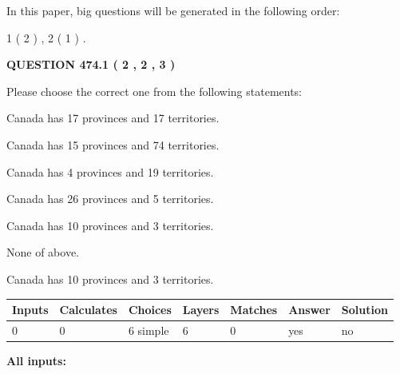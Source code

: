 \documentclass[12pt]{article}
\begin{document}
\vspace{0.2in}
   
In this paper, big questions will be generated in the following order: 
   
   
   1 ( 2 )
 ,
   2 ( 1 )
 .
  
\vspace{0.2in}
  
{\textbf{\Large{QUESTION
474.1 
 ( 2 , 2 , 3 )
}}}
  
  
Please choose the correct one from the following statements:
 
 
Canada has  17 provinces and  17 territories.
 
 
Canada has  15 provinces and  74 territories.
 
 
Canada has   4 provinces and  19 territories.
 
 
Canada has  26 provinces and  5 territories.
 
 
Canada has 10  provinces and 3 territories.
 
 
 None of above.
 
 
\noindent{}
 
 
Canada has 10  provinces and 3 territories.
 
 
\noindent{}
 
 
   
   
   
   
\noindent\begin{tabular}{|l|l|l|l|l|l|l|}
 \hline
Inputs & Calculates & Choices & Layers & Matches & Answer & Solution \\ \hline
 0  & 
 0  & 
 6
  simple  
  & 
 6  & 
 0  & 
  yes & 
  no 
  \\ \hline
 \end{tabular}
   
   
   
   
\noindent{}
   
   
   
   
\noindent\vspace{0.1in}\hspace{-0.08in} {\textbf{\Large{All inputs: }}}
   
\end{document}
